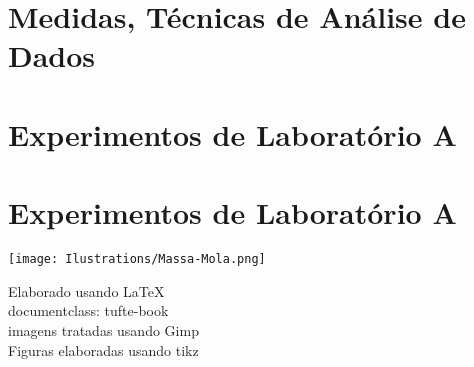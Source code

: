 \documentclass[justified,a4paper,symmetric,nobib]{tufte-book}
\title{}
\author{Clebson Abati Graeff}
\title[Notas de aula de laboratório]{%
  Notas de aula: \\ Laboratórios de Física A e B. \par \vfill
  \hfill\usebox{\titleimage}}
\begin{document}
\frontmatter
\pagestyle{empty}



\mainmatter
\pagestyle{fancy}

\part{Medidas, Técnicas de Análise de Dados}







\part{Experimentos de Laboratório A}
 















\part{Experimentos de Laboratório A}
 










\printbibliography
\cleardoublepage
\thispagestyle{empty}
\begin{figure*}
\centering
\texttt{[image: Ilustrations/Massa-Mola.png]}
\end{figure*}
\vfill
\begin{fullwidth}
\begin{center}\sc
Elaborado usando \LaTeX \\
documentclass: tufte-book \\
imagens tratadas usando Gimp \\
Figuras elaboradas usando tikz
\end{center}
\end{fullwidth}
\end{document}
